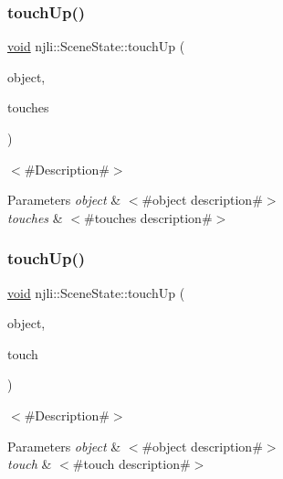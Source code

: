 \subsubsection{\texorpdfstring{touch\+Up()}{touchUp()}\hspace{0.1cm}{\footnotesize\ttfamily [1/2]}}
{\footnotesize\ttfamily \mbox{\hyperlink{_thread_8h_af1e856da2e658414cb2456cb6f7ebc66}{void}} njli\+::\+Scene\+State\+::touch\+Up (\begin{DoxyParamCaption}\item[{\mbox{\hyperlink{classnjli_1_1_scene}{Scene}} $\ast$}]{object,  }\item[{\mbox{\hyperlink{classnjli_1_1_device_touch}{Device\+Touch}} $\ast$$\ast$}]{touches }\end{DoxyParamCaption})}

$<$\#\+Description\#$>$


\begin{DoxyParams}{Parameters}
{\em object} & $<$\#object description\#$>$ \\
\hline
{\em touches} & $<$\#touches description\#$>$ \\
\hline
\end{DoxyParams}
\mbox{\label{classnjli_1_1_scene_state_a4201c0cc0281fa0a0686bc18508f3ee4}} 
\subsubsection{\texorpdfstring{touch\+Up()}{touchUp()}\hspace{0.1cm}{\footnotesize\ttfamily [2/2]}}
{\footnotesize\ttfamily \mbox{\hyperlink{_thread_8h_af1e856da2e658414cb2456cb6f7ebc66}{void}} njli\+::\+Scene\+State\+::touch\+Up (\begin{DoxyParamCaption}\item[{\mbox{\hyperlink{classnjli_1_1_scene}{Scene}} $\ast$}]{object,  }\item[{const \mbox{\hyperlink{classnjli_1_1_device_touch}{Device\+Touch}} \&}]{touch }\end{DoxyParamCaption})}

$<$\#\+Description\#$>$


\begin{DoxyParams}{Parameters}
{\em object} & $<$\#object description\#$>$ \\
\hline
{\em touch} & $<$\#touch description\#$>$ \\
\hline
\end{DoxyParams}
\mbox{\label{classnjli_1_1_scene_state_a4b0106f0f24fa972164621f077751de9}} 
